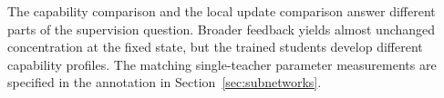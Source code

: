 \begin{table}[t]
\caption{Online PG/I64 capability pairs (\%). Each pair shares the setting and update count. Mean averages the four domain scores. Single-teacher and joint updates have different per-domain response counts.}
\label{tab:density_capability}
\centering\small

\end{table}

The capability comparison and the local update comparison answer different parts of the supervision question. Broader feedback yields almost unchanged concentration at the fixed state, but the trained students develop different capability profiles. The matching single-teacher parameter measurements are specified in the annotation in Section~\ref{sec:subnetworks}.
